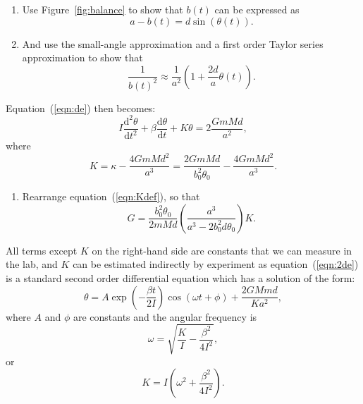 \documentclass{article}
\begin{document}
\begin{enumerate}[resume]
\item Use Figure~\ref{fig:balance} to show that $b(t)$ can be expressed
  as
  \[
  a-b(t)=d\sin(\theta(t)).
  \]
\item And use the small-angle approximation and a first order Taylor
  series approximation \cite[e.g., Section 3.1 in][]{SniederVanWijk15}
  to show that
  \begin{equation}
    \frac{1}{b(t)^{2}}\approx\frac{1}{a^{2}}\left(1+\frac{2d}{a}\theta(t)\right).
    \label{eqn:masssep}%
  \end{equation}
\end{enumerate}
Equation~(\ref{eqn:de}) then becomes:%
\begin{equation}
  I\frac{\mathrm{d}^{2}\theta}{\mathrm{d}t^{2}}+\beta\frac{\mathrm{d}\theta
  }{\mathrm{d}t}+K\theta=2\frac{GmMd}{a^{2}},
  \label{eqn:2de}
\end{equation}
where
\begin{equation}
  K=\kappa-\frac{4GmMd^{2}}{a^{3}}=
  \frac{2GmMd}{b_0^{2}\theta_{0}}-\frac{4GmMd^{2}}{a^{3}}.
  \label{eqn:Kdef}
\end{equation}
\begin{enumerate}[resume]
\item Rearrange equation~(\ref{eqn:Kdef}), so that%
  \begin{equation}
    G=\frac{b_0^{2}\theta_{0}}{2mMd}
    \left(\frac{a^{3}}{a^{3}-2b_0^{2}d\theta_{0}}\right)  K.
    \label{eqn:G1}%
  \end{equation}
\end{enumerate}
All terms except $K$ on the right-hand side are constants that we can
measure in the lab, and $K$ can be estimated indirectly by experiment
as equation~(\ref{eqn:2de}) is a standard second order differential
equation which has a solution of the form:%
\begin{equation}
  \theta=A\exp\left(  -\frac{\beta t}{2I}\right)  \cos\left(  \omega
    t+\phi\right)  +\frac{2GMmd}{Ka^{2}},
  \label{eqn:2desol}%
\end{equation}
where $A$ and $\phi$ are constants and the angular frequency is
\begin{equation}
  \omega=\sqrt{\frac{K}{I}-\frac{\beta^{2}}{4I^{2}}},%
\end{equation}
or%
\begin{equation}
  K=I\left(\omega^2+\frac{\beta^{2}}{4I^{2}}\right).
  \label{eqn:G2}%
\end{equation}
\end{document}
